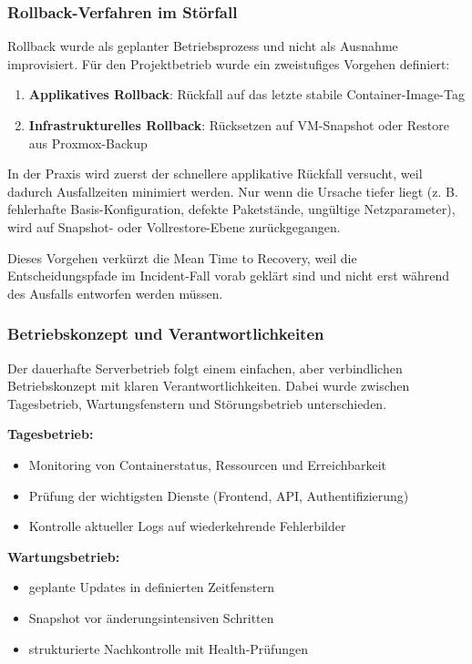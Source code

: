 \subsubsection{Rollback-Verfahren im Störfall}

Rollback wurde als geplanter Betriebsprozess und nicht als Ausnahme improvisiert. Für den Projektbetrieb wurde ein zweistufiges Vorgehen definiert:

\begin{enumerate}
    \item \textbf{Applikatives Rollback}: Rückfall auf das letzte stabile Container-Image-Tag
    \item \textbf{Infrastrukturelles Rollback}: Rücksetzen auf VM-Snapshot oder Restore aus Proxmox-Backup
\end{enumerate}

In der Praxis wird zuerst der schnellere applikative Rückfall versucht, weil dadurch Ausfallzeiten minimiert werden. Nur wenn die Ursache tiefer liegt (z. B. fehlerhafte Basis-Konfiguration, defekte Paketstände, ungültige Netzparameter), wird auf Snapshot- oder Vollrestore-Ebene zurückgegangen.

Dieses Vorgehen verkürzt die Mean Time to Recovery, weil die Entscheidungspfade im Incident-Fall vorab geklärt sind und nicht erst während des Ausfalls entworfen werden müssen.

\subsubsection{Betriebskonzept und Verantwortlichkeiten}

Der dauerhafte Serverbetrieb folgt einem einfachen, aber verbindlichen Betriebskonzept mit klaren Verantwortlichkeiten. Dabei wurde zwischen Tagesbetrieb, Wartungsfenstern und Störungsbetrieb unterschieden.

\textbf{Tagesbetrieb:}
\begin{itemize}
    \item Monitoring von Containerstatus, Ressourcen und Erreichbarkeit
    \item Prüfung der wichtigsten Dienste (Frontend, API, Authentifizierung)
    \item Kontrolle aktueller Logs auf wiederkehrende Fehlerbilder
\end{itemize}

\textbf{Wartungsbetrieb:}
\begin{itemize}
    \item geplante Updates in definierten Zeitfenstern
    \item Snapshot vor änderungsintensiven Schritten
    \item strukturierte Nachkontrolle mit Health-Prüfungen
\end{itemize}

